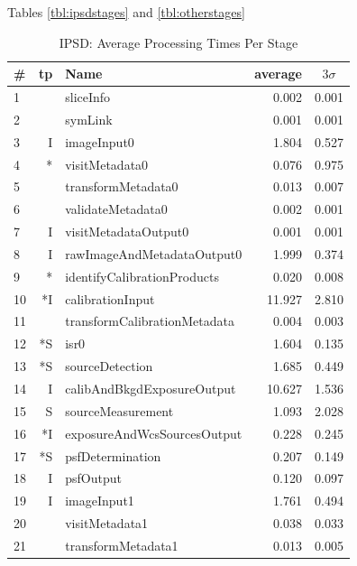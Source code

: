 Tables \ref{tbl:ipsdstages} and \ref{tbl:otherstages}

\begin{table}[p]
\begin{center}
\small
\caption{IPSD: Average Processing Times Per Stage
\label{tbl:visitstats}}
\vspace{\baselineskip}
\begin{tabular}{lrlrr}
\hline\hline
\# & tp & Name & \multicolumn{1}{c}{average}&\multicolumn{1}{c}{$3\sigma$} \\ 
\hline
 1 &    &                     sliceInfo &  0.002 &  0.001 \\
 2 &    &                       symLink &  0.001 &  0.001 \\
 3 &  I &                   imageInput0 &  1.804 &  0.527 \\
 4 & *\phantom{I} &                visitMetadata0 &  0.076 &  0.975 \\
 5 &    &            transformMetadata0 &  0.013 &  0.007 \\
 6 &    &             validateMetadata0 &  0.002 &  0.001 \\
 7 &  I &          visitMetadataOutput0 &  0.001 &  0.001 \\
 8 &  I &    rawImageAndMetadataOutput0 &  1.999 &  0.374 \\
 9 & *\phantom{I}  &   identifyCalibrationProducts &  0.020 &  0.008 \\
10 & *I &              calibrationInput & 11.927 &  2.810 \\
11 &    &  transformCalibrationMetadata &  0.004 &  0.003 \\
12 & *S &                          isr0 &  1.604 &  0.135 \\
13 & *S &               sourceDetection &  1.685 &  0.449 \\
14 &  I &    calibAndBkgdExposureOutput & 10.627 &  1.536 \\
15 &  S &             sourceMeasurement &  1.093 &  2.028 \\
16 & *I &   exposureAndWcsSourcesOutput &  0.228 &  0.245 \\
17 & *S &              psfDetermination &  0.207 &  0.149 \\
18 &  I &                     psfOutput &  0.120 &  0.097 \\
19 &  I &                   imageInput1 &  1.761 &  0.494 \\
20 &    &                visitMetadata1 &  0.038 &  0.033 \\
21 &    &            transformMetadata1 &  0.013 &  0.005 \\

\end{tabular}
\end{center}
\end{table}
